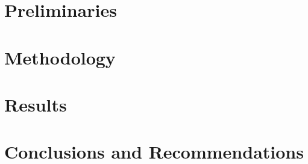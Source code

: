 \documentclass[a4paper,10pt,twoside]{report}
\begin{document}

\chapter{Preliminaries}\label{chapter:preliminaries}



% 


\chapter{Methodology}\label{chapter:methodology}


\chapter{Results}\label{chapter:results}



\chapter{Conclusions and Recommendations}\label{chapter:conclusions}



%
% 




\appendix
{}


\end{document}
